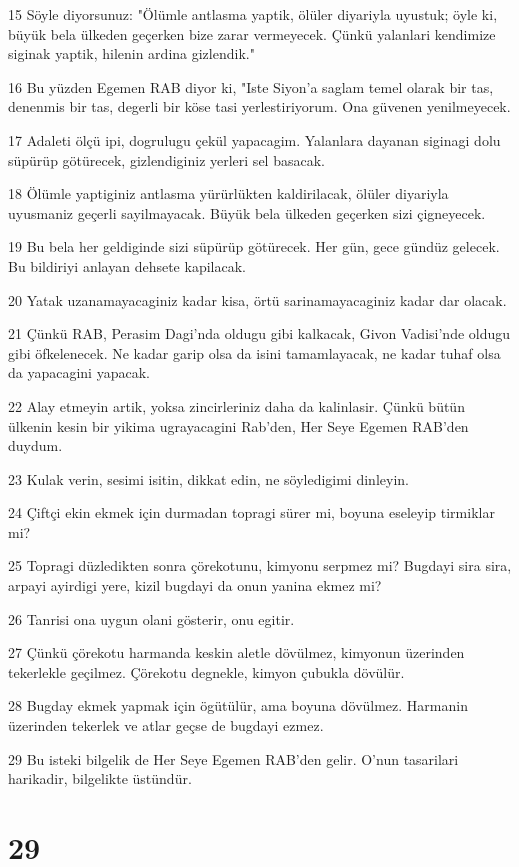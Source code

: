 \par 15 Söyle diyorsunuz: "Ölümle antlasma yaptik, ölüler diyariyla uyustuk; öyle ki, büyük bela ülkeden geçerken bize zarar vermeyecek. Çünkü yalanlari kendimize siginak yaptik, hilenin ardina gizlendik."
\par 16 Bu yüzden Egemen RAB diyor ki, "Iste Siyon'a saglam temel olarak bir tas, denenmis bir tas, degerli bir köse tasi yerlestiriyorum. Ona güvenen yenilmeyecek.
\par 17 Adaleti ölçü ipi, dogrulugu çekül yapacagim. Yalanlara dayanan siginagi dolu süpürüp götürecek, gizlendiginiz yerleri sel basacak.
\par 18 Ölümle yaptiginiz antlasma yürürlükten kaldirilacak, ölüler diyariyla uyusmaniz geçerli sayilmayacak. Büyük bela ülkeden geçerken sizi çigneyecek.
\par 19 Bu bela her geldiginde sizi süpürüp götürecek. Her gün, gece gündüz gelecek. Bu bildiriyi anlayan dehsete kapilacak.
\par 20 Yatak uzanamayacaginiz kadar kisa, örtü sarinamayacaginiz kadar dar olacak.
\par 21 Çünkü RAB, Perasim Dagi'nda oldugu gibi kalkacak, Givon Vadisi'nde oldugu gibi öfkelenecek. Ne kadar garip olsa da isini tamamlayacak, ne kadar tuhaf olsa da yapacagini yapacak.
\par 22 Alay etmeyin artik, yoksa zincirleriniz daha da kalinlasir. Çünkü bütün ülkenin kesin bir yikima ugrayacagini Rab'den, Her Seye Egemen RAB'den duydum.
\par 23 Kulak verin, sesimi isitin, dikkat edin, ne söyledigimi dinleyin.
\par 24 Çiftçi ekin ekmek için durmadan topragi sürer mi, boyuna eseleyip tirmiklar mi?
\par 25 Topragi düzledikten sonra çörekotunu, kimyonu serpmez mi? Bugdayi sira sira, arpayi ayirdigi yere, kizil bugdayi da onun yanina ekmez mi?
\par 26 Tanrisi ona uygun olani gösterir, onu egitir.
\par 27 Çünkü çörekotu harmanda keskin aletle dövülmez, kimyonun üzerinden tekerlekle geçilmez. Çörekotu degnekle, kimyon çubukla dövülür.
\par 28 Bugday ekmek yapmak için ögütülür, ama boyuna dövülmez. Harmanin üzerinden tekerlek ve atlar geçse de bugdayi ezmez.
\par 29 Bu isteki bilgelik de Her Seye Egemen RAB'den gelir. O'nun tasarilari harikadir, bilgelikte üstündür.

\chapter{29}

